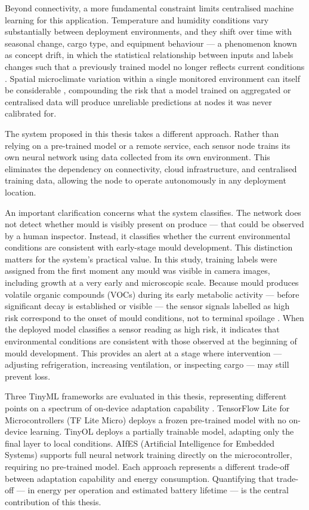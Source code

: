 Beyond connectivity, a more fundamental constraint limits centralised machine learning for this application. Temperature and humidity conditions vary substantially between deployment environments, and they shift over time with seasonal change, cargo type, and equipment behaviour --- a phenomenon known as concept drift, in which the statistical relationship between inputs and labels changes such that a previously trained model no longer reflects current conditions \cite{Bayram2022, Ilic2023}. Spatial microclimate variation within a single monitored environment can itself be considerable \cite{Ferentinos2017}, compounding the risk that a model trained on aggregated or centralised data will produce unreliable predictions at nodes it was never calibrated for.

The system proposed in this thesis takes a different approach. Rather than relying on a pre-trained model or a remote service, each sensor node trains its own neural network using data collected from its own environment. This eliminates the dependency on connectivity, cloud infrastructure, and centralised training data, allowing the node to operate autonomously in any deployment location.

An important clarification concerns what the system classifies. The network does not detect whether mould is visibly present on produce --- that could be observed by a human inspector. Instead, it classifies whether the current environmental conditions are consistent with early-stage mould development. This distinction matters for the system's practical value. In this study, training labels were assigned from the first moment any mould was visible in camera images, including growth at a very early and microscopic scale. Because mould produces volatile organic compounds (VOCs) during its early metabolic activity --- before significant decay is established or visible --- the sensor signals labelled as high risk correspond to the onset of mould conditions, not to terminal spoilage \cite{Yang2025, Ma2023}. When the deployed model classifies a sensor reading as high risk, it indicates that environmental conditions are consistent with those observed at the beginning of mould development. This provides an alert at a stage where intervention --- adjusting refrigeration, increasing ventilation, or inspecting cargo --- may still prevent loss.

Three TinyML frameworks are evaluated in this thesis, representing different points on a spectrum of on-device adaptation capability \cite{Dutta2021, Ficco2024}. TensorFlow Lite for Microcontrollers (TF Lite Micro) \cite{David2021} deploys a frozen pre-trained model with no on-device learning. TinyOL \cite{Disabato2021} deploys a partially trainable model, adapting only the final layer to local conditions. AIfES (Artificial Intelligence for Embedded Systems) \cite{Wulfert2024} supports full neural network training directly on the microcontroller, requiring no pre-trained model. Each approach represents a different trade-off between adaptation capability and energy consumption. Quantifying that trade-off --- in energy per operation and estimated battery lifetime --- is the central contribution of this thesis.

